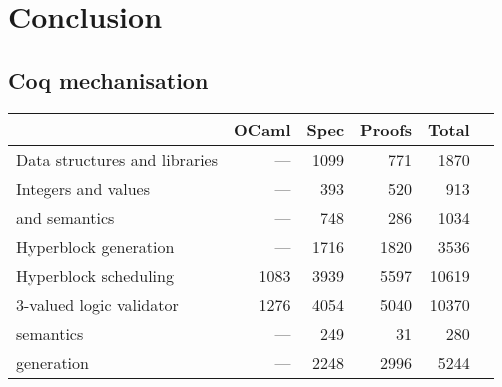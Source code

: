 \chapter{Conclusion}%
\label{sec:conclusion}

\section{Coq mechanisation}

\begin{table}
  \centering
  \label{tab:proof_statistics}
  \begin{tabular}{lrrrrr}
    \toprule
    & \textbf{OCaml} & \textbf{Spec} & \textbf{Proofs} & \textbf{Total}\\
    \midrule
    {Data structures and libraries}       & --- & 1099 &  771 &  1870 \\
    {Integers and values}                 & --- &  393 &  520 &   913 \\
    {\rtlblock{} and \rtlpar{} semantics} &  --- & 748 &  286 &  1034 \\
    {Hyperblock generation}               &  --- & 1716 & 1820 &  3536 \\
    {Hyperblock scheduling}               & 1083 & 3939 & 5597 & 10619 \\
    {3-valued logic validator}            & 1276 & 4054 & 5040 & 10370 \\
    {\htl{} semantics}                    &  --- &  249 &   31 &   280 \\
    {\htl{} generation}                   &  --- & 2248 & 2996 &  5244 \\

\end{tabular}
\end{table}
